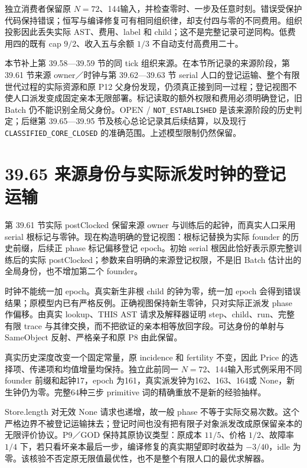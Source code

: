 \documentclass[
  11pt,
  oneside]{book}
\begin{document}
独立消费者保留原 \(N=72\)、144输入，并检查零时、一步及任意时刻。错误受保护代码保持错误；恒写与编译修复可有相同组织律，却支付四与零的不同费用。组织投影因此丢失实际 AST、费用、label 和 child；这不是完整记录可逆同构。低费用四的既有 cap \(9/2\)、收入五与余额 \(1/3\) 不自动支付高费用二十。

本节补上第 39.58---39.59 节的同 tick 组织来源。在本节所记录的来源阶段，第 39.61 节来源 owner／时钟与第 39.62---39.63 节 serial 人口的登记运输、整个有限世代过程的实际资源和原 P12 父身份发现，仍须真正接到同一过程；登记视图不使人口派发变成固定亲本无限部署。标记读取的额外权限和费用必须明确登记，旧 Batch 仍不能识别全局父身份。OPEN / \nolinkurl{NOT_ESTABLISHED} 是该来源阶段的历史判定；后继第 39.65---39.95 节及核心总论记录其后续结算，以及现行 \nolinkurl{CLASSIFIED_CORE_CLOSED} 的准确范围。上述模型限制仍然保留。

\section{39.65 来源身份与实际派发时钟的登记运输}\label{ux6765ux6e90ux8eabux4efdux4e0eux5b9eux9645ux6d3eux53d1ux65f6ux949fux7684ux767bux8bb0ux8fd0ux8f93}

第 39.61 节实际 postClocked 保留来源 owner 与训练后的起钟，而真实人口采用 serial 根标记与零钟。现在构造明确的登记视图：根标记替换为实际 founder 的历史前缀，后续正 phase 标记偏移登记 epoch。初始 serial 根因此恰好表示原完整训练后的实际 postClocked；参数来自明确的来源登记权限，不是旧 Batch 估计出的全局身份，也不增加第二个 founder。

时钟不能统一加 epoch。真实新生非根 child 的钟为零，统一加 epoch 会得到错误结果；原模型内已有严格反例。正确视图保持新生零钟，只对实际正派发 phase 作偏移。由真实 lookup、THIS AST 请求及解释器证明 step、child、run、完整有限 trace 与其律交换，而不把欲证的亲本相等放回字段。可达身份的单射与 SameObject 反射、严格亲子和原 P8 由此保留。

真实历史深度改变一个固定常量，原 incidence 和 fertility 不变，因此 Price 的选择项、传递项和均值增量均保持。独立此前同一 \(N=72\)、144输入形式例采用不同 founder 前缀和起钟17，epoch 为161，真实派发钟为162、163、164或 None，新生钟仍为零。完整64种三步 primitive 词的精确重放不是新的经验抽样。

Store.length 对无效 None 请求也递增，故一般 phase 不等于实际交易次数。这个严格边界不被登记运输抹去；登记时间也没有把有限子对象派发改成原保留亲本的无限评价协议。P9／GOD 保持其原协议类型：原成本 \(11/5\)、价格 \(1/2\)、故障率 \(1/4\) 下，若只看坏亲本最后一步，编译修复的真实期望即时收益为 \(-3/40\)，idle 为零。该核验不否定原无限值最优性，也不是整个有限人口的最优求解器。
\end{document}
